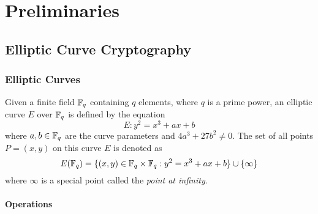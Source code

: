\chapter{Preliminaries}

\section{Elliptic Curve Cryptography}

\subsection{Elliptic Curves}

\begin{definition}\label{def:elliptic_curve}
  Given a finite field $\mathbb{F}_{q}$ containing $q$ elements, where $q$ is a prime
  power, an elliptic curve $E$ over $\mathbb{F}_{q}$ is defined by the equation
  \begin{equation}\label{eqn:elliptic_curve}
    E: y^2 = x^3 + a x + b
  \end{equation}
  where $a, b \in \mathbb{F}_{q}$ are the curve parameters and $4 a^3 + 27 b^2 \neq 0$.
  The set of all points $P = (x, y)$ on this curve $E$ is denoted as
  \begin{equation*}
    E(\mathbb{F}_{q}) = \{ (x, y) \in \mathbb{F}_{q} \times \mathbb{F}_{q} : y^2 = x^3 + a x + b \}
                         \cup \{ \infty \}
  \end{equation*}
  where $\infty$ is a special point called the \emph{point at infinity}.
\end{definition}

\subsubsection{Operations}


